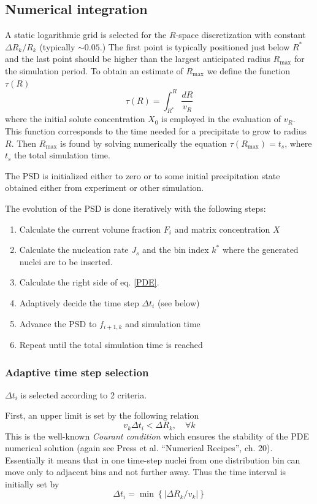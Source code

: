 \documentclass[12pt,a4paper]{article}
\begin{document}
\subsection{Numerical integration}

A static logarithmic grid is selected for the $R$-space discretization with constant $\Delta R_k / R_k$ (typically $\sim 0.05$.) The first point is typically positioned just below $R^*$ and the last point should be higher than the largest anticipated radius $R_{\max}$ for the simulation period. To obtain an estimate of $R_{\max}$ we define the function $\tau(R)$
\[
\tau(R) = \int_{R^*}^{R}{\frac{dR}{v_R}}
\] 
where the initial solute concentration $X_0$ is employed in the evaluation of $v_R$. This function corresponds to the time needed for a precipitate to grow to radius $R$. Then $R_{\max}$ is found by solving numerically the equation $\tau(R_{\max}) = t_s$, where $t_s$ the total simulation time.

The PSD is initialized either to zero or to some initial precipitation state obtained either from experiment or other simulation.

The evolution of the PSD is done iteratively with the following steps:
\begin{enumerate}
\item Calculate the current volume fraction $F_i$ and matrix concentration $X$
\item Calculate the nucleation rate $J_s$ and the bin index $k^*$ where the generated nuclei are to be inserted.
\item Calculate the right side of eq. \eqref{PDE}.
\item Adaptively decide the time step $\Delta t_i$ (see below)
\item Advance the PSD to $f_{i+1,k}$ and simulation time
\item Repeat until the total simulation time is reached 
\end{enumerate}

\subsubsection{Adaptive time step selection}
$\Delta t_i$ is selected according to 2 criteria.

First, an upper limit is set by the following relation
\begin{equation}
v_k  \Delta t_i < \Delta R_k, \quad \forall k
\end{equation}
This is the well-known \textit{Courant condition} which ensures the stability of the PDE numerical solution (again see Press et al. ``Numerical Recipes'', ch. 20). Essentially it means that in one time-step nuclei from one distribution bin can move only to adjacent bins and not further away. Thus the time interval is initially set by
\begin{equation}
\Delta t_i = \min \left\lbrace  | \Delta R_k / v_k | \right\rbrace 
\end{equation}
\end{document}
